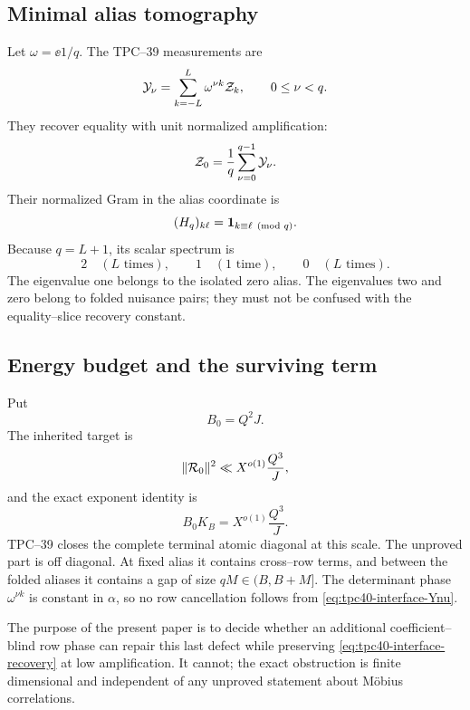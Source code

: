 \subsection{Minimal alias tomography}

Let \(\omega=\ee{1/q}\).  The TPC--39 measurements are
\begin{equation}
 \mathcal Y_\nu
 =\sum_{k=-L}^{L}\omega^{\nu k}\mathcal Z_k,
 \qquad 0\le\nu<q.
 \label{eq:tpc40-interface-Ynu}
\end{equation}
They recover equality with unit normalized amplification:
\begin{equation}
 \mathcal Z_0=\frac1q\sum_{\nu=0}^{q-1}\mathcal Y_\nu.
 \label{eq:tpc40-interface-recovery}
\end{equation}
Their normalized Gram in the alias coordinate is
\begin{equation}
 (H_q)_{k\ell}
 =\mathbf 1_{k\equiv\ell\pmod q}.
 \label{eq:tpc40-interface-Hq}
\end{equation}
Because \(q=L+1\), its scalar spectrum is
\begin{equation}
 2\quad(L\text{ times}),
 \qquad
 1\quad(1\text{ time}),
 \qquad
 0\quad(L\text{ times}).
 \label{eq:tpc40-interface-Hq-spectrum}
\end{equation}
The eigenvalue one belongs to the isolated zero alias.  The eigenvalues
two and zero belong to folded nuisance pairs; they must not be confused
with the equality--slice recovery constant.

\subsection{Energy budget and the surviving term}

Put
\begin{equation}
 B_0=Q^2J.
 \label{eq:tpc40-interface-B0}
\end{equation}
The inherited target is
\begin{equation}
 \|\mathcal R_0\|^2
 \ll X^{o(1)}\frac{Q^3}{J},
 \label{eq:tpc40-interface-target}
\end{equation}
and the exact exponent identity is
\begin{equation}
 B_0K_B=X^{o(1)}\frac{Q^3}{J}.
 \label{eq:tpc40-interface-budget}
\end{equation}
TPC--39 closes the complete terminal atomic diagonal at this scale.  The
unproved part is off diagonal.  At fixed alias it contains cross--row
terms, and between the folded aliases it contains a gap of size
\(qM\in(B,B+M]\).  The determinant phase \(\omega^{\nu k}\) is constant
in \(\alpha\), so no row cancellation follows from
\eqref{eq:tpc40-interface-Ynu}.

The purpose of the present paper is to decide whether an additional
coefficient--blind row phase can repair this last defect while preserving
\eqref{eq:tpc40-interface-recovery} at low amplification.  It cannot;
the exact obstruction is finite dimensional and independent of any
unproved statement about M\"obius correlations.
